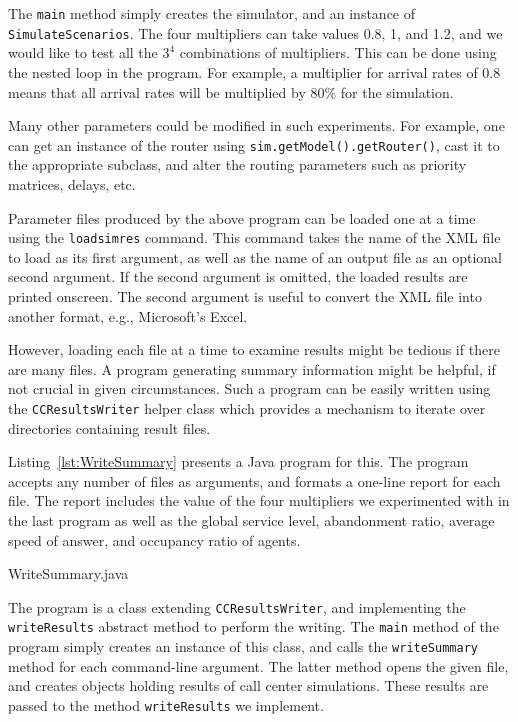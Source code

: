 The \texttt{main} method simply creates the simulator, and an instance
of \texttt{Simulate\-Scenarios}.
The four multipliers can take values 0.8, 1, and 1.2, and we would
like to test all the $3^4$ combinations of multipliers.
This can be done using the nested loop in the program.
For example, a multiplier for arrival rates of 0.8 means that
all arrival rates will be multiplied by 80\% for the simulation.

Many other parameters could be modified in such experiments.
For example, one can get an instance of the router using
\texttt{sim.get\-Model().get\-Router()}, cast it to the appropriate
subclass, and alter the routing parameters such as priority matrices,
delays, etc.

Parameter files produced by the above program can be loaded one at a
time using the \texttt{loadsimres} command.
This command takes the name of the XML file to load as its first argument, as
well as the name of an output file as an optional second argument.
If the second argument is omitted, the loaded results are printed onscreen.
The second argument is useful to convert the XML file into
another format, e.g., Microsoft's Excel.

However, loading each file at a time to examine results might be
tedious if there are many files.
A program generating summary information might be helpful, if not
crucial in given circumstances.
Such a program can be easily written using the
\texttt{CC\-Results\-Writer} helper class which provides a mechanism
to iterate over directories containing result files.

Listing~\ref{lst:WriteSummary} presents a Java program for this.
The program accepts any number of files as arguments, and formats a
one-line report for each file. The report includes the value of the
four multipliers we experimented with in the last program as
well as the global service level, abandonment ratio, average speed of
answer, and occupancy ratio of agents.


{WriteSummary.java}

The program is a class extending \texttt{CC\-Results\-Writer}, and
implementing the \texttt{write\-Results} abstract method
to perform the writing.
The \texttt{main} method of the program simply creates an instance of
this class, and calls the \texttt{write\-Summary} method for each
command-line argument.
The latter method opens the given file, and creates objects holding
results of call center simulations.  These results are passed to the
method \texttt{write\-Results} we implement.

